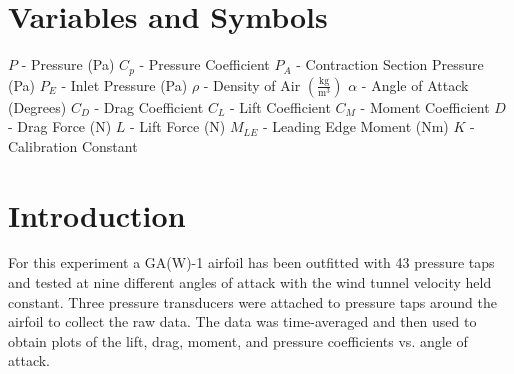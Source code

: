 \documentclass[12pt]{article}
\begin{document}
\section*{Variables and Symbols}
\(P\) - Pressure (Pa) \newline\newline
\(C_p\) - Pressure Coefficient \newline\newline
\(P_A\) - Contraction Section Pressure (Pa) \newline\newline
\(P_E\) - Inlet Pressure (Pa) \newline\newline
\(\rho\) - Density of Air \(\left(\frac{\mbox{kg}}{{\mbox{m}}^3}\right)\) \newline\newline
\(\alpha\) - Angle of Attack (Degrees) \newline\newline
\(C_D\) - Drag Coefficient\newline\newline
\(C_L\) - Lift Coefficient\newline\newline
\(C_M\) - Moment Coefficient\newline\newline
\(D\) - Drag Force (N)\newline\newline
\(L\) - Lift Force (N)\newline\newline
\(M_{LE}\) - Leading Edge Moment (Nm)\newline\newline
\(K\) - Calibration Constant \newline\newline

\newline
\newpage
\tableofcontents
\label{sec:Abstract}
\newpage
 

\section{Introduction}
For this experiment a GA(W)-1 airfoil has been outfitted with 43 pressure taps and tested at nine different angles of attack with the wind tunnel velocity held constant. Three pressure transducers were attached to pressure taps around the airfoil to collect the raw data. The data was time-averaged and then  used to obtain plots of the lift, drag, moment, and pressure coefficients vs. angle of attack.
\newpage
\end{document}

